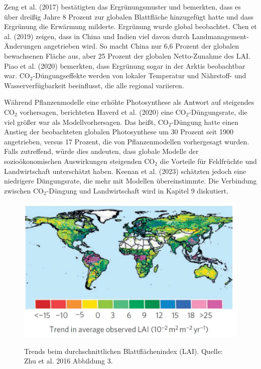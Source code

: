 \documentclass[12pt,paper=a4,DIV=12,parskip=never,chapterprefix=false,headings=standardclasses]{scrreprt}
\begin{document}
Zeng et al. (2017) bestätigten das Ergrünungsmuster und bemerkten, dass es über dreißig Jahre 8 Prozent zur globalen Blattfläche hinzugefügt hatte und dass Ergrünung die Erwärmung milderte. Ergrünung wurde global beobachtet. Chen et al. (2019) zeigen, dass in China und Indien viel davon durch Landmanagement-Änderungen angetrieben wird. So macht China nur 6,6 Prozent der globalen bewachsenen Fläche aus, aber 25 Prozent der globalen Netto-Zunahme des LAI. Piao et al. (2020) bemerkten, dass Ergrünung sogar in der Arktis beobachtbar war. CO$_2$-Düngungseffekte werden von lokaler Temperatur und Nährstoff- und Wasserverfügbarkeit beeinflusst, die alle regional variieren.

Während Pflanzenmodelle eine erhöhte Photosynthese als Antwort auf steigendes CO$_2$ vorhersagen, berichteten Haverd et al. (2020) eine CO$_2$-Düngungsrate, die viel größer war als Modellvorhersagen. Das heißt, CO$_2$-Düngung hatte einen Anstieg der beobachteten globalen Photosynthese um 30 Prozent seit 1900 angetrieben, versus 17 Prozent, die von Pflanzenmodellen vorhergesagt wurden. Falls zutreffend, würde dies andeuten, dass globale Modelle der sozioökonomischen Auswirkungen steigenden CO$_2$ die Vorteile für Feldfrüchte und Landwirtschaft unterschätzt haben. Keenan et al. (2023) schätzten jedoch eine niedrigere Düngungsrate, die mehr mit Modellen übereinstimmte. Die Verbindung zwischen CO$_2$-Düngung und Landwirtschaft wird in Kapitel 9 diskutiert.

\begin{figure}[H]
\begin{center}
\includegraphics[width=1.0\textwidth]{bilder/bilderKlima-0002.jpg}\\[1cm]
\end{center}
\caption{Trends beim durchschnittlichen Blattflächenindex (LAI). Quelle: Zhu et al. 2016 Abbildung 3.}
\end{figure}
\end{document}
